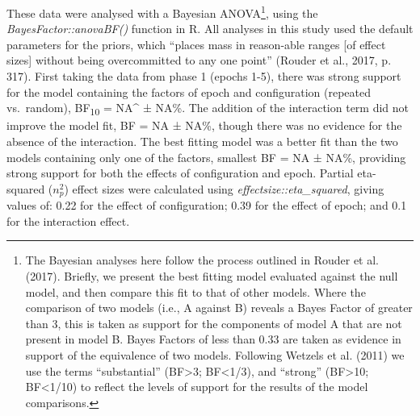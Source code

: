 \documentclass[
  man,
  floatsintext,
  longtable,
  nolmodern,
  notxfonts,
  notimes,
  colorlinks=true,linkcolor=blue,citecolor=blue,urlcolor=blue]{apa7}
\begin{document}
These data were analysed with a Bayesian ANOVA\footnote{The Bayesian
  analyses here follow the process outlined in Rouder et al. (2017).
  Briefly, we present the best fitting model evaluated against the null
  model, and then compare this fit to that of other models. Where the
  comparison of two models (i.e., A against B) reveals a Bayes Factor of
  greater than 3, this is taken as support for the components of model A
  that are not present in model B. Bayes Factors of less than 0.33 are
  taken as evidence in support of the equivalence of two models.
  Following Wetzels et al. (2011) we use the terms ``substantial''
  (BF\textgreater3; BF\textless1/3), and ``strong'' (BF\textgreater10;
  BF\textless1/10) to reflect the levels of support for the results of
  the model comparisons.}, using the \emph{BayesFactor::anovaBF()}
function in R. All analyses in this study used the default parameters
for the priors, which ``places mass in reason-able ranges {[}of effect
sizes{]} without being overcommitted to any one point'' (Rouder et al.,
2017, p. 317). First taking the data from phase 1 (epochs 1-5), there
was strong support for the model containing the factors of epoch and
configuration (repeated vs.~random), BF\textsubscript{10} = NA\^{} ±
NA\%. The addition of the interaction term did not improve the model
fit, BF = NA ± NA\%, though there was no evidence for the absence of the
interaction. The best fitting model was a better fit than the two models
containing only one of the factors, smallest BF = NA ± NA\%, providing
strong support for both the effects of configuration and epoch. Partial
eta-squared (\(n^2_p\)) effect sizes were calculated using
\emph{effectsize::eta\_squared}, giving values of: 0.22 for the effect
of configuration; 0.39 for the effect of epoch; and 0.1 for the
interaction effect.
\end{document}
